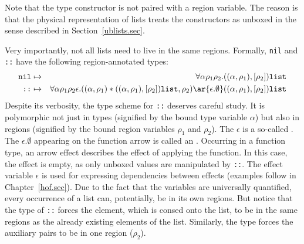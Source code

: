 \documentclass[12pt]{book}
\begin{document}
Note that the  type constructor is not paired with a region variable.
The reason is that the physical representation of lists treats the constructors
as unboxed in the sense described in Section~\ref{ublists.sec}.

Very importantly, not all lists need to live in the same regions.
Formally, {\tt nil} and {\tt ::} have the following region-annotated types:
\begin{eqnarray*}
\boxml{nil} & \mapsto & \forall\alpha\rho_1\rho_2.((\alpha,\rho_1),[\rho_2])\boxml{list}\\
\boxml{::}  & \mapsto & \forall\alpha\rho_1\rho_2\epsilon.((\alpha,\rho_1)\ast((\alpha,\rho_1),[\rho_2])\boxml{list},\rho_2)
\ar{\epsilon.\emptyset} ((\alpha,\rho_1),[\rho_2])\boxml{list}
\end{eqnarray*}
Despite its verbosity, 
the type scheme for {\tt ::} deserves careful study. It is polymorphic not just in types
(signified by the bound type variable $\alpha$) but also in  regions (signified by the 
bound region variables $\rho_1$ and $\rho_2$). The $\epsilon$ is a so-called . 
The $\epsilon.\emptyset$ appearing on the function arrow is called an .
Occurring in a function type, an arrow effect describes the effect of applying the function.
In this case, the effect is empty, as only unboxed values are manipulated by {\tt ::}. The effect variable $\epsilon$ 
is used for expressing dependencies between effects (examples follow in Chapter~\ref{hof.sec}). Due to the fact that 
the variables are universally quantified, every occurrence of a list can, potentially, be in its own regions. But notice 
that the type of {\tt ::} forces the element, which is consed onto the list, to be in the same regions 
as the already existing elements of the list. Similarly, the type forces the auxiliary pairs to be in
one region ($\rho_2$).
\end{document}
